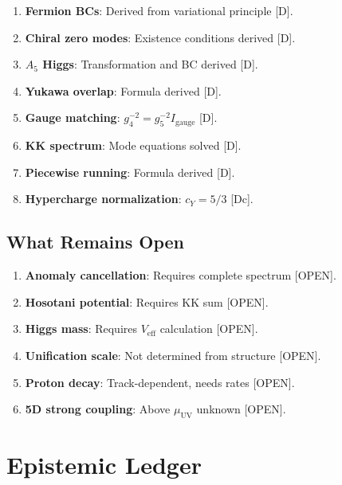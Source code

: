 \documentclass[11pt,a4paper]{article}
\begin{document}
\begin{enumerate}
\item \textbf{Fermion BCs}: Derived from variational principle [D].
\item \textbf{Chiral zero modes}: Existence conditions derived [D].
\item \textbf{$A_5$ Higgs}: Transformation and BC derived [D].
\item \textbf{Yukawa overlap}: Formula derived [D].
\item \textbf{Gauge matching}: $g_4^{-2} = g_5^{-2} I_{\text{gauge}}$ [D].
\item \textbf{KK spectrum}: Mode equations solved [D].
\item \textbf{Piecewise running}: Formula derived [D].
\item \textbf{Hypercharge normalization}: $c_Y = 5/3$ [Dc].
\end{enumerate}

\subsection{What Remains Open}

\begin{enumerate}
\item \textbf{Anomaly cancellation}: Requires complete spectrum [OPEN].
\item \textbf{Hosotani potential}: Requires KK sum [OPEN].
\item \textbf{Higgs mass}: Requires $V_{\text{eff}}$ calculation [OPEN].
\item \textbf{Unification scale}: Not determined from structure [OPEN].
\item \textbf{Proton decay}: Track-dependent, needs rates [OPEN].
\item \textbf{5D strong coupling}: Above $\mu_{\text{UV}}$ unknown [OPEN].
\end{enumerate}

\section{Epistemic Ledger}
\label{sec:ledger}
\end{document}
